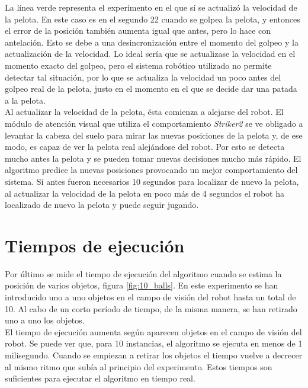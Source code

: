 La línea verde representa el experimento en el que sí se actualizó la velocidad de la pelota. En este caso es en el segundo 22 cuando se golpea la pelota, y entonces el error de la posición también aumenta igual que antes, pero lo hace con antelación. Esto se debe a una desincronización entre el momento del golpeo y la actualización de la velocidad. Lo ideal sería que se actualizase la velocidad en el momento exacto del golpeo, pero el sistema robótico utilizado no permite detectar tal situación, por lo que se actualiza la velocidad un poco antes del golpeo real de la pelota, justo en el momento en el que se decide dar una patada a la pelota. \\

Al actualizar la velocidad de la pelota, ésta comienza a alejarse del robot. El módulo de atención visual que utiliza el comportamiento \textit{Striker2} se ve obligado a levantar la cabeza del suelo para mirar las nuevas posiciones de la pelota y, de ese modo, es capaz de ver la pelota real alejándose del robot. Por esto se detecta mucho antes la pelota y se pueden tomar nuevas decisiones mucho más rápido. El algoritmo predice la nuevas posiciones provocando un mejor comportamiento del sistema. Si antes fueron necesarios 10 segundos para localizar de nuevo la pelota, al actualizar la velocidad de la pelota en poco más de 4 segundos el robot ha localizado de nuevo la pelota y puede seguir jugando. \\

\section{Tiempos de ejecución}
\label{sec:tiemposejecucion}

Por último se mide el tiempo de ejecución del algoritmo cuando se estima la posición de varios objetos, figura \ref{fig:10_balls}. En este experimento se han introducido uno a uno objetos en el campo de visión del robot hasta un total de 10. Al cabo de un corto período de tiempo, de la misma manera, se han retirado uno a uno los objetos. \\

El tiempo de ejecución aumenta según aparecen objetos en el campo de visión del robot. Se puede ver que, para 10 instancias, el algoritmo se ejecuta en menos de 1 milisegundo. Cuando se empiezan a retirar los objetos el tiempo vuelve a decrecer al mismo ritmo que subía al principio del experimento. Estos tiempos son suficientes para ejecutar el algoritmo en tiempo real. \\

